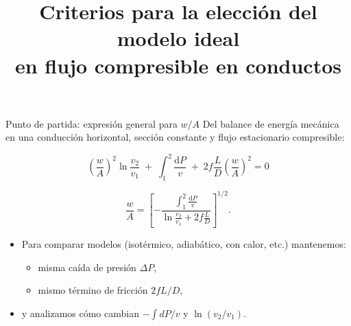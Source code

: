 \documentclass[aspectratio=169]{beamer}
\title[Criterios de modelo ideal]{Criterios para la elección del modelo ideal\\en flujo compresible en conductos}
\author{}
\date{}
\begin{document}
\begin{frame}
  \titlepage
\end{frame}

\begin{frame}{Punto de partida: expresión general para $w/A$}
Del balance de energía mecánica en una conducción horizontal, sección constante y flujo estacionario compresible:

\begin{equation*}
\left(\frac{w}{A}\right)^2 \ln\!\frac{v_2}{v_1}
\;+\;\int_1^2 \frac{\mathrm dP}{v}
\;+\;2 f \frac{L}{D}\left(\frac{w}{A}\right)^2 = 0
\end{equation*}

\pause

\begin{equation*}
\frac{w}{A}
=
\left[
-\frac{\displaystyle \int_1^2 \frac{\mathrm dP}{v}}
{\displaystyle \ln\!\frac{v_2}{v_1} + 2 f\frac{L}{D}}
\right]^{1/2}.
\end{equation*}

\pause

\begin{itemize}
  \item Para comparar modelos (isotérmico, adiabático, con calor, etc.) mantenemos:
  \begin{itemize}
    \item misma caída de presión $\Delta P$,
    \item mismo término de fricción $2fL/D$,
  \end{itemize}
  \item y analizamos cómo cambian $-\int dP/v$ y $\ln(v_2/v_1)$.
\end{itemize}
\end{frame}

\end{document}
